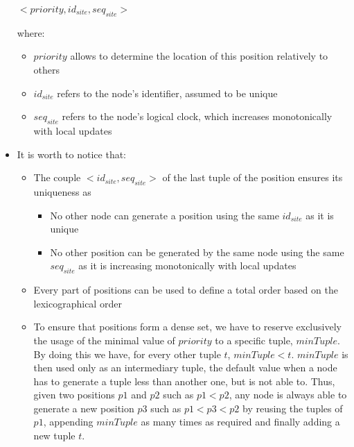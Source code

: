 \documentclass{article}
\begin{document}
\begin{itemize}
    \begin{center}
        $<priority, id_{site}, seq_{site}>$
    \end{center}

    where:

    \begin{itemize}
        \item $priority$ allows to determine the location of this position relatively to others
        \item $id_{site}$ refers to the node's identifier, assumed to be unique
        \item $seq_{site}$ refers to the node's logical clock, which increases monotonically with local updates
    \end{itemize}


    \item It is worth to notice that: 
    \begin{itemize}
        \item The couple $<id_{site}, seq_{site}>$ of the last tuple of the position ensures its uniqueness as
        \begin{itemize}
            \item No other node can generate a position using the same $id_{site}$ as it is unique
            \item No other position can be generated by the same node using the same $seq_{site}$ as it is increasing monotonically with local updates
        \end{itemize}
        \item Every part of positions can be used to define a total order based on the lexicographical order
        \item To ensure that positions form a dense set, we have to reserve exclusively the usage of the minimal value of $priority$ to a specific tuple, $minTuple$. By doing this we have, for every other tuple $t$, $minTuple < t$. $minTuple$ is then used only as an intermediary tuple, the default value when a node has to generate a tuple less than another one, but is not able to. Thus, given two positions $p1$ and $p2$ such as $p1 < p2$, any node is always able to generate a new position $p3$ such as $p1 < p3 < p2$ by reusing the tuples of $p1$, appending $minTuple$ as many times as required and finally adding a new tuple $t$.
    \end{itemize}
\end{itemize}
\end{document}
